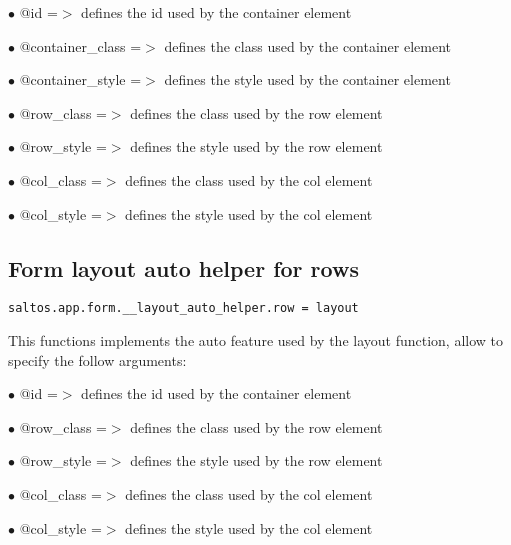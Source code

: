 \documentclass[a4paper]{book}
\begin{document}
\begin{compactitem}
\item[\color{myblue}$\bullet$] @id              =$>$ defines the id used by the container element
\item[\color{myblue}$\bullet$] @container\_class =$>$ defines the class used by the container element
\item[\color{myblue}$\bullet$] @container\_style =$>$ defines the style used by the container element
\item[\color{myblue}$\bullet$] @row\_class       =$>$ defines the class used by the row element
\item[\color{myblue}$\bullet$] @row\_style       =$>$ defines the style used by the row element
\item[\color{myblue}$\bullet$] @col\_class       =$>$ defines the class used by the col element
\item[\color{myblue}$\bullet$] @col\_style       =$>$ defines the style used by the col element
\end{compactitem}

\hypertarget{toc408}{}
\subsection{Form layout auto helper for rows}

\begin{lstlisting}
saltos.app.form.__layout_auto_helper.row = layout
\end{lstlisting}

This functions implements the auto feature used by the layout function, allow to specify the
follow arguments:

\begin{compactitem}
\item[\color{myblue}$\bullet$] @id              =$>$ defines the id used by the container element
\item[\color{myblue}$\bullet$] @row\_class       =$>$ defines the class used by the row element
\item[\color{myblue}$\bullet$] @row\_style       =$>$ defines the style used by the row element
\item[\color{myblue}$\bullet$] @col\_class       =$>$ defines the class used by the col element
\item[\color{myblue}$\bullet$] @col\_style       =$>$ defines the style used by the col element
\end{compactitem}

\hypertarget{toc409}{}
\end{document}
